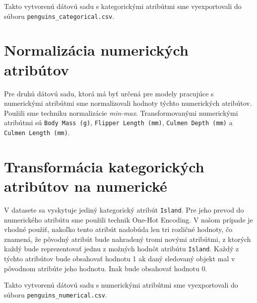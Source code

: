 \documentclass[10pt,xcolor=pdflatex,dvipsnames,table,oneside]{book}
\begin{document}
Takto vytvorenú dátovú sadu s kategorickými atribútmi sme vyexportovali do súboru \texttt{penguins\_categorical.csv}.

\section*{Normalizácia numerických atribútov}
Pre druhú dátovú sadu, ktorá má byť určená pre modely pracujúce s numerickými atribútmi sme normalizovali hodnoty týchto numerických atribútov. Použili sme techniku normalizácie \textit{min-max}. Transformovanými numerickými atribútmi sú \texttt{Body Mass (g)}, \texttt{Flipper Length (mm)}, \texttt{Culmen Depth (mm)} a \texttt{Culmen Length (mm)}.

\section*{Transformácia kategorických atribútov na numerické}
V datasete sa vyskytuje jediný kategorický atribút \texttt{Island}. Pre jeho prevod do numerického atribútu sme použili technik One-Hot Encoding. V našom prípade je vhodné použiť, nakoľko tento atribút nadobúda len tri rozličné hodnoty, čo znamená, že pôvodný atribút bude nahradený tromi novými atribútmi, z ktorých každý bude reprezentovať jednu z možných hodnôt atribútu \texttt{Island}. Každý z týchto atribútov bude obsahovať hodnotu 1 ak daný sledovaný objekt mal v pôvodnom atribúte jeho hodnotu. Inak bude obsahovať hodnotu 0.

Takto vytvorenú dátovú sadu s numerickými atribútmi sme vyexportovali do súboru \texttt{penguins\_numerical.csv}.
\end{document}
